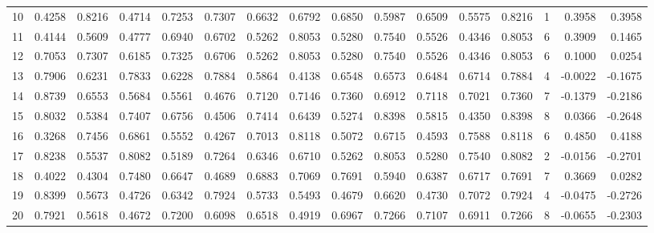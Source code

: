 \begin{tabular}{lrrrrrrrrrrrrrrr}
10  &      0.4258 &  0.8216 &  0.4714 &  0.7253 &  0.7307 &  0.6632 &  0.6792 &  0.6850 &  0.5987 &  0.6509 &   0.5575 &     0.8216 &      1 &                    0.3958 &                     0.3958 \\
11  &      0.4144 &  0.5609 &  0.4777 &  0.6940 &  0.6702 &  0.5262 &  0.8053 &  0.5280 &  0.7540 &  0.5526 &   0.4346 &     0.8053 &      6 &                    0.3909 &                     0.1465 \\
12  &      0.7053 &  0.7307 &  0.6185 &  0.7325 &  0.6706 &  0.5262 &  0.8053 &  0.5280 &  0.7540 &  0.5526 &   0.4346 &     0.8053 &      6 &                    0.1000 &                     0.0254 \\
13  &      0.7906 &  0.6231 &  0.7833 &  0.6228 &  0.7884 &  0.5864 &  0.4138 &  0.6548 &  0.6573 &  0.6484 &   0.6714 &     0.7884 &      4 &                   -0.0022 &                    -0.1675 \\
14  &      0.8739 &  0.6553 &  0.5684 &  0.5561 &  0.4676 &  0.7120 &  0.7146 &  0.7360 &  0.6912 &  0.7118 &   0.7021 &     0.7360 &      7 &                   -0.1379 &                    -0.2186 \\
15  &      0.8032 &  0.5384 &  0.7407 &  0.6756 &  0.4506 &  0.7414 &  0.6439 &  0.5274 &  0.8398 &  0.5815 &   0.4350 &     0.8398 &      8 &                    0.0366 &                    -0.2648 \\
16  &      0.3268 &  0.7456 &  0.6861 &  0.5552 &  0.4267 &  0.7013 &  0.8118 &  0.5072 &  0.6715 &  0.4593 &   0.7588 &     0.8118 &      6 &                    0.4850 &                     0.4188 \\
17  &      0.8238 &  0.5537 &  0.8082 &  0.5189 &  0.7264 &  0.6346 &  0.6710 &  0.5262 &  0.8053 &  0.5280 &   0.7540 &     0.8082 &      2 &                   -0.0156 &                    -0.2701 \\
18  &      0.4022 &  0.4304 &  0.7480 &  0.6647 &  0.4689 &  0.6883 &  0.7069 &  0.7691 &  0.5940 &  0.6387 &   0.6717 &     0.7691 &      7 &                    0.3669 &                     0.0282 \\
19  &      0.8399 &  0.5673 &  0.4726 &  0.6342 &  0.7924 &  0.5733 &  0.5493 &  0.4679 &  0.6620 &  0.4730 &   0.7072 &     0.7924 &      4 &                   -0.0475 &                    -0.2726 \\
20  &      0.7921 &  0.5618 &  0.4672 &  0.7200 &  0.6098 &  0.6518 &  0.4919 &  0.6967 &  0.7266 &  0.7107 &   0.6911 &     0.7266 &      8 &                   -0.0655 &                    -0.2303 \\

\end{tabular}
